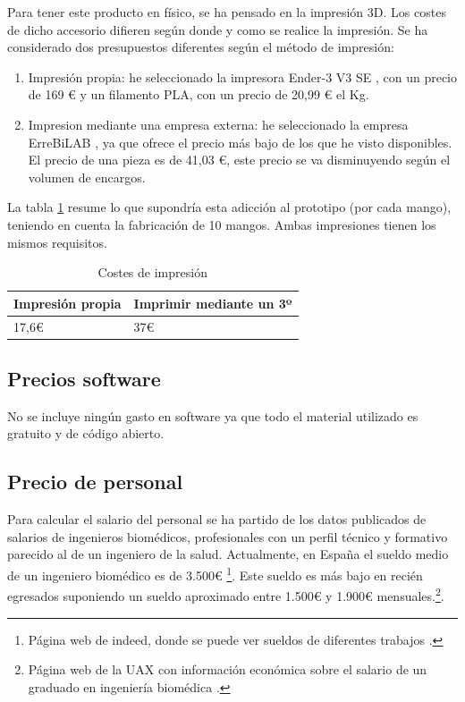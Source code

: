 Para tener este producto en físico, se ha pensado en la impresión 3D. Los costes de dicho accesorio difieren según donde y como se realice la impresión. 
Se ha considerado dos presupuestos diferentes según el método de impresión:
\begin{enumerate}
    \item Impresión propia: he seleccionado la impresora Ender-3 V3 SE \cite{Ender-3}, con un precio de 169 € y un filamento PLA\cite{PLA}, con un precio de 20,99 € el Kg. 
    \item Impresion mediante una empresa externa: he seleccionado la empresa ErreBiLAB \cite{ErreBiLAB}, ya que ofrece el precio más bajo de los que he visto disponibles. El precio de una pieza es de 41,03 €, este precio se va disminuyendo según el volumen de encargos. 
\end{enumerate}

La tabla \ref{tab:Impresión} resume lo que supondría esta adicción al prototipo (por cada mango), teniendo en cuenta la fabricación de 10 mangos. 
Ambas impresiones tienen los mismos requisitos.
\begin{table}[h] 
    \centering
    \begin{tabular}{|l|l|}
    \hline
    \rowcolor[HTML]{BFBFBF} 
    \textbf{Impresión propia} & \textbf{Imprimir mediante un 3º} \\ \hline
     17,6€ & 37€  \\ \hline
    \end{tabular}
    \caption{Costes de impresión}
    \label{tab:Impresión}
\end{table}

\subsection{Precios software}
No se incluye ningún gasto en software ya que todo el material utilizado es gratuito y de código abierto.

\subsection{Precio de personal}
Para calcular el salario del personal se ha partido de los datos publicados de salarios de ingenieros biomédicos, profesionales con un perfil técnico y formativo parecido al de un ingeniero de la salud.
Actualmente, en España el sueldo medio de un ingeniero biomédico es de 3.500€ \cite{SueldoBioing}\footnote{Página web de indeed, donde se puede ver sueldos de diferentes trabajos \cite{SueldoBioing}.}\cite{SUELDO}. Este sueldo es más bajo en recién egresados suponiendo un sueldo aproximado entre 1.500€ y 1.900€ mensuales.\cite{Sueldo_egresado}\footnote{Página web de la UAX con información económica sobre el salario de un graduado en ingeniería biomédica \cite{Sueldo_egresado}.}.


